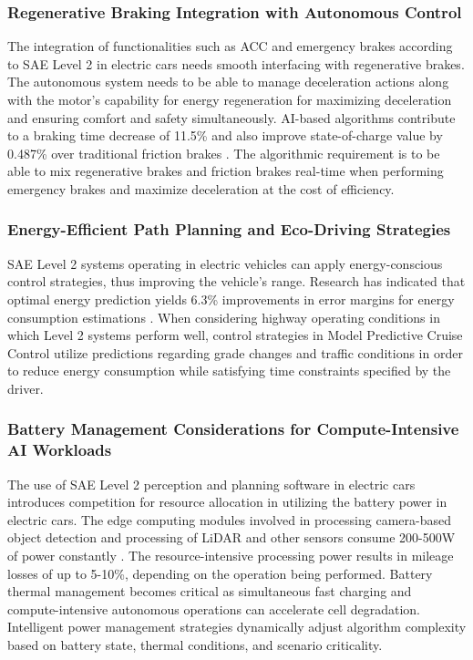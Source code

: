 \documentclass[12pt, a4paper]{report}
\begin{document}
\subsubsection{Regenerative Braking Integration with Autonomous Control}

The integration of functionalities such as ACC and emergency brakes according to SAE Level 2 in electric cars needs smooth interfacing with regenerative brakes. The autonomous system needs to be able to manage deceleration actions along with the motor's capability for energy regeneration for maximizing deceleration and ensuring comfort and safety simultaneously. AI-based algorithms contribute to a braking time decrease of 11.5\% and also improve state-of-charge value by 0.487\% over traditional friction brakes \cite{ref23}. The algorithmic requirement is to be able to mix regenerative brakes and friction brakes real-time when performing emergency brakes and maximize deceleration at the cost of efficiency.

\subsubsection{Energy-Efficient Path Planning and Eco-Driving Strategies}

SAE Level 2 systems operating in electric vehicles can apply energy-conscious control strategies, thus improving the vehicle's range. Research has indicated that optimal energy prediction yields 6.3\% improvements in error margins for energy consumption estimations \cite{ref24}. When considering highway operating conditions in which Level 2 systems perform well, control strategies in Model Predictive Cruise Control utilize predictions regarding grade changes and traffic conditions in order to reduce energy consumption while satisfying time constraints specified by the driver.

\subsubsection{Battery Management Considerations for Compute-Intensive AI Workloads}

The use of SAE Level 2 perception and planning software in electric cars introduces competition for resource allocation in utilizing the battery power in electric cars. The edge computing modules involved in processing camera-based object detection and processing of LiDAR and other sensors consume 200-500W of power constantly \cite{ref25}. The resource-intensive processing power results in mileage losses of up to 5-10\%, depending on the operation being performed. Battery thermal management becomes critical as simultaneous fast charging and compute-intensive autonomous operations can accelerate cell degradation. Intelligent power management strategies dynamically adjust algorithm complexity based on battery state, thermal conditions, and scenario criticality.
\end{document}
